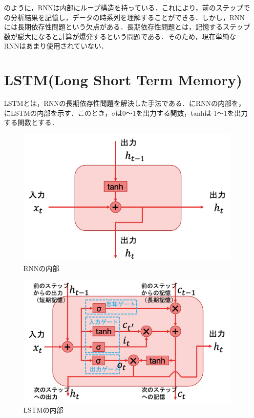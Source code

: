 \documentclass{eithesis}
\begin{document}
		のように，RNNは内部にループ構造を持っている．これにより，前のステップでの分析結果を記憶し，データの時系列を理解することができる．しかし，RNNには長期依存性問題という欠点がある．長期依存性問題とは，記憶するステップ数が膨大になると計算が爆発するという問題である．そのため，現在単純なRNNはあまり使用されていない．

	\section{LSTM(Long Short Term Memory)}
		LSTMとは，RNNの長期依存性問題を解決した手法である．にRNNの内部を，にLSTMの内部を示す．このとき，$\sigma$は0〜1を出力する関数，tanhは-1〜1を出力する関数とする．
		\begin{figure}[htbp]
			\centering
			\includegraphics[width=14cm]{./images/RNN_inner.png}
			\caption{RNNの内部}
			\label{fig_RNN_inner}
		\end{figure}
		\begin{figure}[htbp]
			\centering
			\includegraphics[width=14cm]{./images/LSTM_inner.png}
			\caption{LSTMの内部}
			\label{fig_LSTM_inner}
		\end{figure}
\end{document}
